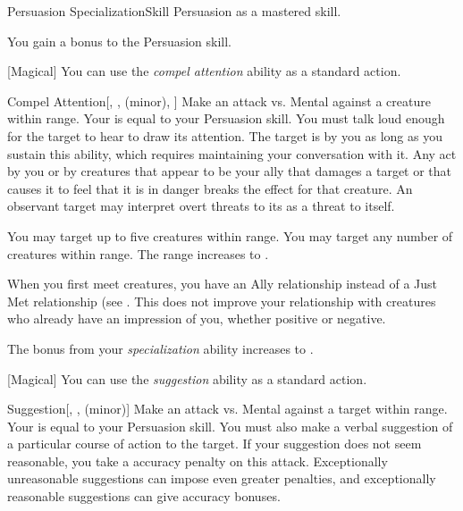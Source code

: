     \begin{feat}{Persuasion Specialization}{Skill}
        \featpre Persuasion as a mastered skill.

         You gain a  bonus to the Persuasion skill.

        [Magical] You can use the \textit{compel attention} ability as a standard action.
        \begin{freeability}{Compel Attention}[, ,  (minor), ]
            Make an attack vs. Mental against a creature within \rngmed range.
            Your  is equal to your Persuasion skill.
            You must talk loud enough for the target to hear to draw its attention.
            \hit The target is \fascinated by you as long as you sustain this ability, which requires maintaining your conversation with it.
            Any act by you or by creatures that appear to be your ally that damages a target or that causes it to feel that it is in danger breaks the effect for that creature.
            An observant target may interpret overt threats to its  as a threat to itself.

            \rankline
             You may target up to five creatures within range.
             You may target any number of creatures within range.
             The range increases to \distrange.
        \end{freeability}

         When you first meet creatures, you have an Ally relationship instead of a Just Met relationship (see .
        This does not improve your relationship with creatures who already have an impression of you, whether positive or negative.

         The bonus from your \textit{specialization} ability increases to .

        [Magical] You can use the \textit{suggestion} ability as a standard action.
        \begin{freeability}{Suggestion}[, ,  (minor)]
            Make an attack vs. Mental against a target within \rngmed range.
            Your  is equal to your Persuasion skill.
            You must also make a verbal suggestion of a particular course of action to the target.
            If your suggestion does not seem reasonable, you take a  accuracy penalty on this attack.
            Exceptionally unreasonable suggestions can impose even greater penalties, and exceptionally reasonable suggestions can give accuracy bonuses.


\end{freeability}
\end{feat}

